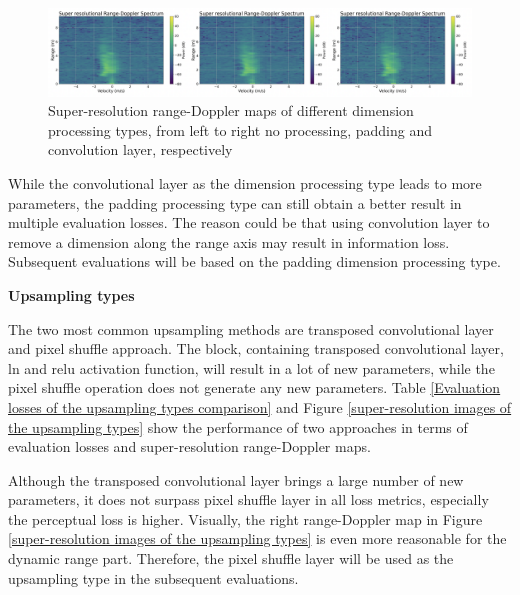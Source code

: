 \begin{figure}
    \centering
    \includegraphics[scale=.45]{figures/evaluation_processing_mse_B.png}
    \caption{Super-resolution range-Doppler maps of different dimension processing types, from left to right no processing, padding and convolution layer, respectively}
    \label{super-resolution images of the dimension processing types}
\end{figure}

While the convolutional layer as the dimension processing type leads to more parameters, the padding processing type can still obtain a better result in multiple evaluation losses. The reason could be that using convolution layer to remove a dimension along the range axis may result in information loss. Subsequent evaluations will be based on the padding dimension processing type.

\begin{spacing}{1.5}
\textbf{\large{Upsampling types}}
\end{spacing}
The two most common upsampling methods are transposed convolutional layer and pixel shuffle approach. The block, containing transposed convolutional layer, \gls{ln} and \gls{relu} activation function, will result in a lot of new parameters, while the pixel shuffle operation does not generate any new parameters. Table \ref{Evaluation losses of the upsampling types comparison} and Figure \ref{super-resolution images of the upsampling types} show the performance of two approaches in terms of evaluation losses and super-resolution range-Doppler maps.

Although the transposed convolutional layer brings a large number of new parameters, it does not surpass pixel shuffle layer in all loss metrics, especially the perceptual loss is higher. Visually, the right range-Doppler map in Figure \ref{super-resolution images of the upsampling types} is even more reasonable for the dynamic range part. Therefore, the pixel shuffle layer will be used as the upsampling type in the subsequent evaluations.

